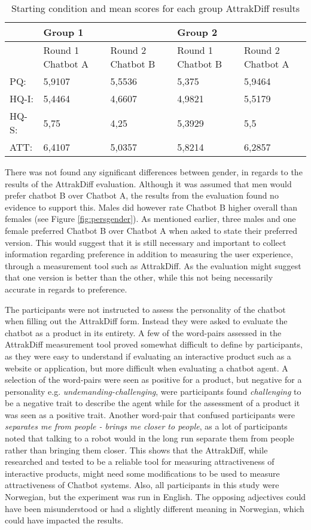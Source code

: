 \begin{table}[H]
\centering
\begin{tabular}{lll|ll}
\hline
& Group 1 &  & Group 2 &  \\
\hline
& Round 1 Chatbot A & Round 2 Chatbot B & Round 1 Chatbot B & Round 2 Chatbot A \\
\hline
PQ: & 5,9107 & 5,5536 & 5,375 & 5,9464 \\
HQ-I: & 5,4464 & 4,6607 & 4,9821 & 5,5179 \\
HQ-S: & 5,75 & 4,25 & 5,3929 & 5,5 \\
ATT: & 6,4107 & 5,0357 & 5,8214 & 6,2857 \\
\end{tabular}
\caption{Starting condition and mean scores for each group AttrakDiff results}
    \label{tab:startconmean}
\end{table}

There was not found any significant differences between gender, in regards to the results of the AttrakDiff evaluation. Although it was assumed that men would prefer chatbot B over Chatbot A, the results from the evaluation found no evidence to support this. Males did however rate Chatbot B higher overall than females (see Figure \ref{fig:persgender}). As mentioned earlier, three males and one female preferred Chatbot B over Chatbot A when asked to state their preferred version. This would suggest that it is still necessary and important to collect information regarding preference in addition to measuring the user experience, through a measurement tool such as AttrakDiff. As the evaluation might suggest that one version is better than the other, while this not being necessarily accurate in regards to preference.

The participants were not instructed to assess the personality of the chatbot when filling out the AttrakDiff form. Instead they were asked to evaluate the chatbot as a product in its entirety. A few of the word-pairs assessed in the AttrakDiff measurement tool proved somewhat difficult to define by participants, as they were easy to understand if evaluating an interactive product such as a website or application, but more difficult when evaluating a chatbot agent. A selection of the word-pairs were seen as positive for a product, but negative for a personality e.g. \textit{undemanding-challenging}, were participants found \textit{challenging} to be a negative trait to describe the agent while for the assessment of a product it was seen as a positive trait. Another word-pair that confused participants were \textit{separates me from people - brings me closer to people}, as a lot of participants noted that talking to a robot would in the long run separate them from people rather than bringing them closer. This shows that the AttrakDiff, while researched and tested to be a reliable tool for measuring attractiveness of interactive products, might need some modifications to be used to measure attractiveness of Chatbot systems. Also, all participants in this study were Norwegian, but the experiment was run in English. The opposing adjectives could have been misunderstood or had a slightly different meaning in Norwegian, which could have impacted the results.


